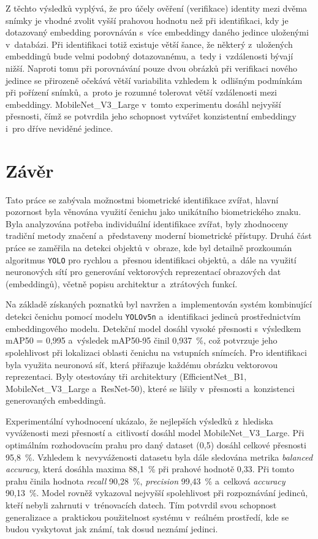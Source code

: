 Z těchto výsledků vyplývá, že pro účely ověření (verifikace) identity mezi dvěma snímky je vhodné zvolit vyšší prahovou hodnotu než při identifikaci, kdy je dotazovaný embedding porovnáván s~více embeddingy daného jedince uloženými v~databázi. Při identifikaci totiž existuje větší šance, že některý z~uložených embeddingů bude velmi podobný dotazovanému, a~tedy i~vzdálenosti bývají nižší. Naproti tomu při porovnávání pouze dvou obrázků při verifikaci nového jedince se přirozeně očekává větší variabilita vzhledem k~odlišným podmínkám při pořízení snímků, a~proto je rozumné tolerovat větší vzdálenosti mezi embeddingy. MobileNet\_V3\_Large v~tomto experimentu dosáhl nejvyšší přesnosti, čímž se potvrdila jeho schopnost vytvářet konzistentní embeddingy i~pro dříve neviděné jedince.

\chapter{Závěr}
Tato práce se zabývala možnostmi biometrické identifikace zvířat, hlavní pozornost byla věnována využití čenichu jako unikátního biometrického znaku. Byla analyzována potřeba individuální identifikace zvířat, byly zhodnoceny tradiční metody značení a~představeny moderní biometrické přístupy. Druhá část práce se zaměřila na detekci objektů v~obraze, kde byl detailně prozkoumán algoritmus \texttt{YOLO} pro rychlou a~přesnou identifikaci objektů, a~dále na využití neuronových sítí pro generování vektorových reprezentací obrazových dat (embeddingů), včetně popisu architektur a~ztrátových funkcí.

Na základě získaných poznatků byl navržen a~implementován systém kombinující detekci čenichu pomocí modelu \texttt{YOLOv5n} a~identifikaci jedinců prostřednictvím embeddingového modelu.
Detekční model dosáhl vysoké přesnosti s~výsledkem mAP50 = 0{,}995 a~výsledek mAP50-95 činil 0{,}937~\%, což potvrzuje jeho spolehlivost při lokalizaci oblasti čenichu na vstupních snímcích.
Pro identifikaci byla využita neuronová síť, která přiřazuje každému obrázku vektorovou reprezentaci. Byly otestovány tři architektury (EfficientNet\_B1, MobileNet\_V3\_Large a~ResNet-50), které se lišily v~přesnosti a~konzistenci generovaných embeddingů.

Experimentální vyhodnocení ukázalo, že nejlepších výsledků z~hlediska vyváženosti mezi přesností a~citlivostí dosáhl model MobileNet\_V3\_Large.
Při optimálním rozhodovacím prahu pro daný dataset (0,5) dosáhl celkové přesnosti 95{,}8~\%.
Vzhledem k~nevyváženosti datasetu byla dále sledována metrika \textit{balanced accuracy}, která dosáhla maxima 88{,}1~\% při prahové hodnotě 0{,}33.
Při tomto prahu činila hodnota \textit{recall} 90{,}28~\%, \textit{precision} 99{,}43~\% a~celková \textit{accuracy} 90{,}13~\%.
Model rovněž vykazoval nejvyšší spolehlivost při rozpoznávání jedinců, kteří nebyli zahrnuti v~trénovacích datech. Tím potvrdil svou schopnost generalizace a~praktickou použitelnost systému v~reálném prostředí, kde se budou vyskytovat jak známí, tak dosud neznámí jedinci.

